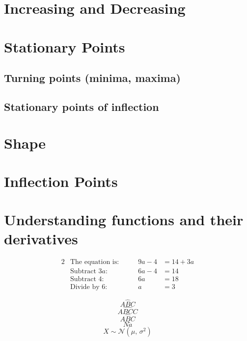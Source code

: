 \documentclass[10pt]{article}
\begin{document}
\section{Increasing and Decreasing}
\section{Stationary Points}
\subsection{Turning points (minima, maxima)}
\subsection{Stationary points of inflection}
\section{Shape}
\section{Inflection Points}
\section{Understanding functions and their derivatives}







\newpage
\begin{alignat*}{2}
	&\text{The equation is:}\qquad & 9a-4 &= 14+3a\\
	&\text{Subtract $3a$:} & 6a-4 &= 14\\
	&\text{Subtract 4:} & 6a &= 18\\
	&\text{Divide by 6:} & a &= 3
\end{alignat*}

$$A\widehat{B}C$$
$$A\widehat{BC}C$$
$$A\hat{B}C$$
$$N \tilde{a}$$
$$X \sim \mathcal{N}(\mu,\,\sigma^{2})$$
\end{document}
